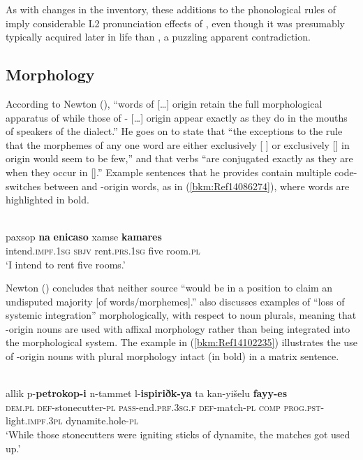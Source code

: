 \documentclass[output=paper]{langsci/langscibook}
\begin{document}
As with changes in the  inventory, these additions to the phonological rules of  imply considerable L2 pronunciation effects of  , even though it was presumably typically acquired later in life than , a puzzling apparent contradiction.

\subsection{Morphology}

According to Newton (\citeyear[43]{Newton1964}), “words of  […] origin retain the full morphological apparatus of  while those of - […] origin appear exactly as they do in the mouths of  speakers of the  dialect.” He goes on to state that “the exceptions to the rule that the morphemes of any one word are either exclusively [ ] or exclusively [] in origin would seem to be few,” and that  verbs “are conjugated exactly as they are when they occur in [].” Example sentences that he provides contain multiple code-switches between  and -origin words, as in (\ref{bkm:Ref14086274}), where  words are highlighted in bold.

\ea\label{bkm:Ref14086274}
\\
\gll paxsop \textbf{na} \textbf{enicaso} xamse \textbf{kamares}\\
     intend.\textsc{impf.1sg} \textsc{sbjv} rent.\textsc{prs.1sg} five room.\textsc{pl}\\
\glt  ‘I intend to rent five rooms.’\z

Newton (\citeyear[50]{Newton1964}) concludes that neither source “would be in a position to claim an undisputed majority [of words/morphemes].” \citet{Gulle2016} also discusses examples of “loss of systemic integration” morphologically, with respect to noun plurals, meaning that -origin nouns are used with  affixal morphology rather than being integrated into the  morphological system. The example in (\ref{bkm:Ref14102235}) illustrates the use of -origin nouns with  plural morphology intact (in bold) in a  matrix sentence.

\ea\label{bkm:Ref14102235}
\\
\gll allik p-\textbf{petrokop-i} n-tammet l-\textbf{ispiriðk-ya} ta kan-yišelu \textbf{fayy-es}\\
     \textsc{dem}.\textsc{pl} \textsc{def}{}-stonecutter-\textsc{pl} \textsc{pass-}end.\textsc{prf.3sg.f} \textsc{def-}match-\textsc{pl} \textsc{comp} \textsc{prog.pst-}light.\textsc{impf.3pl} dynamite.hole-\textsc{pl}\\
\glt ‘While those stonecutters were igniting sticks of dynamite, the matches got used up.’
\z
\end{document}
